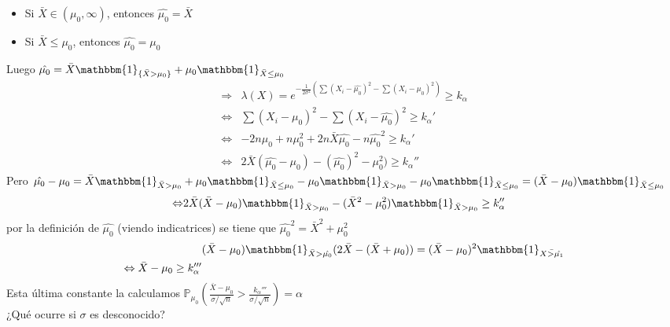 \documentclass[10pt]{article}
\theoremstyle{plain}
\theoremstyle{definition}
\begin{document}
\begin{itemize}
\item Si $\bar{X} \in (\mu_{0},\infty)$, entonces $\hat{\mu_{0}} = \bar{X}$
\item Si $\bar{X}\le \mu_{0}$, entonces $\hat{\mu_{0}}=\mu_{0}$
\end{itemize}
Luego $\hat{\mu_{0}} = \bar{X}\mathbbm{1}_{\{\bar{X}>\mu_{0}\}}+ \mu_{0} \mathbbm{1}_{\bar{X}\le \mu_{0}}$ 
\begin{align*}
\Rightarrow &\lambda(X) = e^{-\frac{1}{2\sigma^2}\left(\sum (X_{i}-\hat{\mu_{0}})^2- \sum (X_{i}-\mu_{0})^2\right)}\ge k_{\alpha}\\
\Leftrightarrow & \sum (X_{i}-\mu_{0})^2 - \sum (X_{i}-\hat{\mu_{0}})^2 \ge k_{\alpha}'\\
\Leftrightarrow &-2n\mu_{0} + n\mu_{0}^2 +2n\bar{X}\hat{\mu_{0}} - n \hat{\mu_{0}}^2 \ge k_{\alpha}'\\
\Leftrightarrow &2\bar{X}(\hat{\mu_{0}}-\mu_{0}) - (\hat{\mu_{0}})^2-\mu_{0}^2) \ge k_{\alpha}''
\end{align*}
Pero $\hat{\mu_{0}} - \mu_{0} = \bar{X}\mathbbm{1}_{\bar{X}>\mu_{0}} + \mu_{0}\mathbbm{1}_{\bar{X}\le \mu_{0}} - \mu_{0}\mathbbm{1}_{\bar{X}>\mu_{0}} - \mu_{0}\mathbbm{1}_{\bar{X}\le \mu_{0}} = (\bar{X}-\mu_{0})\mathbbm{1}_{\bar{X}\le \mu_{0}}$
\begin{align*}
\Leftrightarrow & 2\bar{X}(\bar{X}-\mu_{0})\mathbbm{1}_{\bar{X}>\mu_{0}} - (\bar{X}^2-\mu_{0}^2)\mathbbm{1}_{\bar{X}>\mu_{0}} \ge k_{\alpha}''
\end{align*}
por la definición de $\hat{\mu_{0}}$ (viendo indicatrices) se tiene que $\hat{\mu_{0}}^2 = \bar{X}^2 + \mu_{0}^2$
\begin{align*}
&(\bar{X}-\mu_{0})\mathbbm{1}_{\bar{X}>\hat{\mu_{0}}}(2\bar{X}- (\bar{X}+\mu_{0})) = (\bar{X}-\mu_{0})^2\mathbbm{1}_{\bar{X>\hat{\mu_{1}}}}\\
\Leftrightarrow \bar{X}-\mu_{0} \ge k_{\alpha}'''
\end{align*}
Esta última constante la calculamos $\mathbb{P}_{\mu_{0}}\left(\frac{\bar{X}-\mu_{0}}{\sigma/\sqrt{n}}>\frac{k_{\alpha}'''}{\sigma/\sqrt{n}}\right)= \alpha$\\

¿Qué ocurre si $\sigma$ es desconocido?\\
\end{document}
